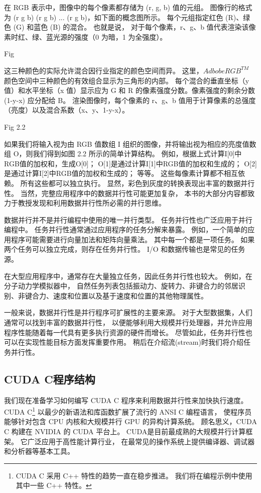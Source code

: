 \begin{remark}
在 RGB 表示中，图像中的每个像素都存储为 (r, g, b) 值的元组。 
图像行的格式为 (r g b) (r g b) ... (r g b)，如下面的概念图所示。 
每个元组指定红色 (R)、绿色 (G) 和蓝色 (B) 的混合。 也就是说，
对于每个像素，r、g、b 值代表渲染该像素时红、绿、蓝光源的强度（0 为暗，1 为全强度）。

{\color{red} Fig}

这三种颜色的实际允许混合因行业指定的颜色空间而异。 
这里，$AdbobeRGB^{TM}$ 颜色空间中三种颜色的有效组合显示为三角形的内部。 
每个混合的垂直坐标（y 值）和水平坐标（x 值）显示应为 G 和 R 的像素强度分数。像素强度的剩余分数 (1-y-x) 应分配给 B。 
渲染图像时，每个像素的 r、g、b 值用于计算像素的总强度（亮度）以及混合系数（x、y、1-y-x）。
\end{remark}

{\color{red} Fig 2.2}

如果我们将输入视为由 RGB 值数组 I 组织的图像，并将输出视为相应的亮度值数组 O，则我们得到如图 2.2 所示的简单计算结构。 
例如，根据上式计算I[0]中RGB值的加权和，生成O[0]； O[1]是通过计算I[1]中RGB值的加权和生成的； 
O[2]是通过计算I[2]中RGB值的加权和生成的； 等等。 这些每像素计算都不相互依赖。 所有这些都可以独立执行。 
显然，彩色到灰度的转换表现出丰富的数据并行性。 当然，完整应用程序中的数据并行性可能更加复杂，
本书的大部分内容都致力于教授发现和利用数据并行性所必需的并行思维。

\begin{remark}[任务并行与数据并行]
数据并行并不是并行编程中使用的唯一并行类型。 任务并行性也广泛应用于并行编程中。 
任务并行性通常通过应用程序的任务分解来暴露。 例如，一个简单的应用程序可能需要进行向量加法和矩阵向量乘法。 
其中每一个都是一项任务。 如果两个任务可以独立完成，则存在任务并行性。 I/O 和数据传输也是常见的任务源。

在大型应用程序中，通常存在大量独立任务，因此任务并行性也较大。 例如，在分子动力学模拟器中，
自然任务列表包括振动力、旋转力、非键合力的邻居识别、非键合力、速度和位置以及基于速度和位置的其他物理属性。

一般来说，数据并行性是并行程序可扩展性的主要来源。 对于大型数据集，人们通常可以找到丰富的数据并行性，
以便能够利用大规模并行处理器，并允许应用程序性能随着每一代具有更多执行资源的硬件而增长。 
尽管如此，任务并行性也可以在实现性能目标方面发挥重要作用。 稍后在介绍流(stream)时我们将介绍任务并行性。
\end{remark}

\subsection{CUDA C程序结构}
我们现在准备学习如何编写 CUDA C 程序来利用数据并行性来加快执行速度。 
CUDA C\footnote{CUDA C 采用 C++ 特性的趋势一直在稳步推进。 我们将在编程示例中使用其中一些 C++ 特性。} 
以最少的新语法和库函数扩展了流行的 ANSI C 编程语言，
使程序员能够针对包含 CPU 内核和大规模并行 GPU 的异构计算系统。 顾名思义，CUDA C 构建在 NVIDIA 的 CUDA 平台上。 
CUDA是目前最成熟的大规模并行计算框架。 它广泛应用于高性能计算行业，
在最常见的操作系统上提供编译器、调试器和分析器等基本工具。

